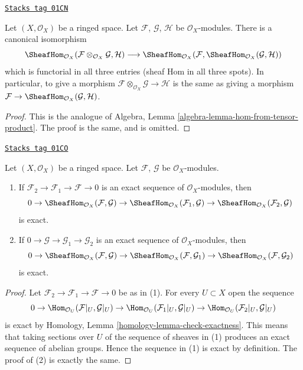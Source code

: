 \begin{lemma}
\label{modules-lemma-internal-hom}
\href{https://stacks.math.columbia.edu/tag/01CN}{\texttt{Stacks tag 01CN}}

Let $(X, \mathcal{O}_X)$ be a ringed space.
Let $\mathcal{F}$, $\mathcal{G}$, $\mathcal{H}$ be $\mathcal{O}_X$-modules.
There is a canonical isomorphism
$$
\SheafHom_{\mathcal{O}_X}
(\mathcal{F} \otimes_{\mathcal{O}_X} \mathcal{G}, \mathcal{H})
\longrightarrow
\SheafHom_{\mathcal{O}_X}
(\mathcal{F}, \SheafHom_{\mathcal{O}_X}(\mathcal{G}, \mathcal{H}))
$$
which is functorial in all three entries (sheaf Hom in
all three spots). In particular, to give a
morphism $\mathcal{F} \otimes_{\mathcal{O}_X} \mathcal{G} \to \mathcal{H}$
is the same as giving a morphism
$\mathcal{F} \to \SheafHom_{\mathcal{O}_X}(\mathcal{G}, \mathcal{H})$.
\end{lemma}

\begin{proof}
This is the analogue of
Algebra, Lemma \ref{algebra-lemma-hom-from-tensor-product}.
The proof is the same, and is omitted.
\end{proof}

\begin{lemma}
\label{modules-lemma-internal-hom-exact}
\href{https://stacks.math.columbia.edu/tag/01CO}{\texttt{Stacks tag 01CO}}

Let $(X, \mathcal{O}_X)$ be a ringed space.
Let $\mathcal{F}$, $\mathcal{G}$ be $\mathcal{O}_X$-modules.
\begin{enumerate}
\item If $\mathcal{F}_2 \to \mathcal{F}_1 \to \mathcal{F} \to 0$
is an exact sequence of $\mathcal{O}_X$-modules, then
$$
0 \to
\SheafHom_{\mathcal{O}_X}(\mathcal{F}, \mathcal{G}) \to
\SheafHom_{\mathcal{O}_X}(\mathcal{F}_1, \mathcal{G}) \to
\SheafHom_{\mathcal{O}_X}(\mathcal{F}_2, \mathcal{G})
$$
is exact.
\item If $0 \to \mathcal{G} \to \mathcal{G}_1 \to \mathcal{G}_2$
is an exact sequence of $\mathcal{O}_X$-modules, then
$$
0 \to
\SheafHom_{\mathcal{O}_X}(\mathcal{F}, \mathcal{G}) \to
\SheafHom_{\mathcal{O}_X}(\mathcal{F}, \mathcal{G}_1) \to
\SheafHom_{\mathcal{O}_X}(\mathcal{F}, \mathcal{G}_2)
$$
is exact.
\end{enumerate}
\end{lemma}

\begin{proof}
Let $\mathcal{F}_2 \to \mathcal{F}_1 \to \mathcal{F} \to 0$
be as in (1). For every $U \subset X$ open the sequence
$$
0 \to \Hom_{\mathcal{O}_U}(\mathcal{F}|_U, \mathcal{G}|_U) \to
\Hom_{\mathcal{O}_U}(\mathcal{F}_1|_U, \mathcal{G}|_U) \to
\Hom_{\mathcal{O}_U}(\mathcal{F}_2|_U, \mathcal{G}|_U)
$$
is exact by Homology, Lemma \ref{homology-lemma-check-exactness}.
This means that
taking sections over $U$ of the sequence of sheaves in (1) produces
an exact sequence of abelian groups. Hence the sequence in (1) is exact
by definition. The proof of (2) is exactly the same.
\end{proof}

